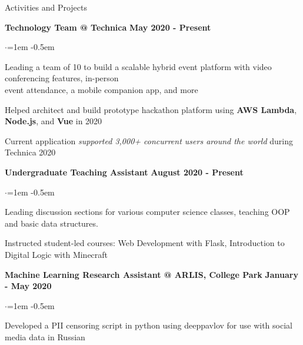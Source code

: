 \documentclass[mm,centered]{resume} %
\begin{document}
\begin{rSection}{Activities and Projects} 

{\bf Technology Team @ Technica}  \hfill {\bf May 2020 - Present}
 \begin{list}{$\cdot$}{\leftmargin=1em} %
   \itemsep -0.5em \vspace{-0.5em} %
		\item Leading a team of 10 to build a scalable hybrid event platform with video conferencing features, in-person \\ event attendance, a mobile companion app, and more
		\item Helped architect and build prototype hackathon platform using \textbf{AWS Lambda}, \textbf{Node.js}, and \textbf{Vue} in 2020
		\item Current application \emph{supported 3,000+ concurrent users around the world} during Technica 2020
  \end{list}

{\bf Undergraduate Teaching Assistant}  \hfill {\bf August 2020 - Present}
 \begin{list}{$\cdot$}{\leftmargin=1em} %
   \itemsep -0.5em \vspace{-0.5em} %
		\item Leading discussion sections for various computer science classes, teaching OOP and basic data structures.
		\item Instructed student-led courses: Web Development with Flask, Introduction to Digital Logic with Minecraft
  \end{list}

{\bf Machine Learning Research Assistant @ ARLIS, College Park}  \hfill {\bf January - May 2020}
 \begin{list}{$\cdot$}{\leftmargin=1em} %
   \itemsep -0.5em \vspace{-0.5em} %
		\item Developed a PII censoring script in python using deeppavlov for use with social media data in Russian
  \end{list}
	

\end{rSection}
\end{document}
